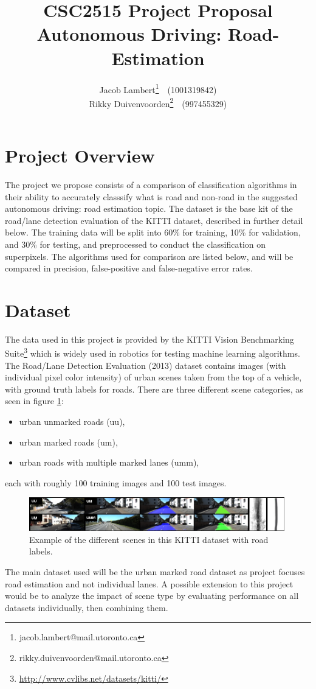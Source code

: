 \documentclass[a4paper,10pt]{article}
\title{\textbf{CSC2515 Project Proposal} \\
Autonomous Driving: Road-Estimation}
\author{
  Jacob Lambert\footnote{jacob.lambert@mail.utoronto.ca}~~(1001319842)\\
  Rikky Duivenvoorden\footnote{rikky.duivenvoorden@mail.utoronto.ca}~~(997455329) \\
}
\date{}
\begin{document}
\maketitle

\section{Project Overview}
The project we propose consists of a comparison of classification algorithms in their ability to accurately classsify what is road and non-road in the suggested autonomous driving: road estimation topic. The dataset is the base kit of the road/lane detection evaluation of the KITTI dataset, described in further detail below. The training data will be split into 60\% for training, 10\% for validation, and 30\% for testing, and preprocessed to conduct the classification on superpixels. The algorithms used for comparison are listed below, and will be compared in precision, false-positive and false-negative error rates.


\section{Dataset}
The data used in this project is provided by the KITTI Vision Benchmarking Suite\footnote{ \url{http://www.cvlibs.net/datasets/kitti/}} which is widely used in robotics for testing machine learning algorithms. The Road/Lane Detection Evaluation (2013) dataset contains images (with individual pixel color intensity) of urban scenes taken from the top of a vehicle, with ground truth labels for roads. There are three different scene categories, as seen in figure \ref{fig:kitti}:
\begin{itemize}
 \item urban unmarked roads (uu),
 \item urban marked roads (um),
 \item urban roads with multiple marked lanes (umm),
\end{itemize}
each with roughly 100 training images and 100 test images.
\begin{figure}[ht!]
 \centering
 \includegraphics[width=0.99\textwidth]{figs/kitti.jpg}
 \caption{Example of the different scenes in this KITTI dataset with road labels.}\label{fig:kitti}
\end{figure}
The main dataset used will be the urban marked road dataset as project focuses road estimation and not individual lanes. A possible extension to this project would be to analyze the impact of scene type by evaluating performance on all datasets individually, then combining them.
\end{document}
